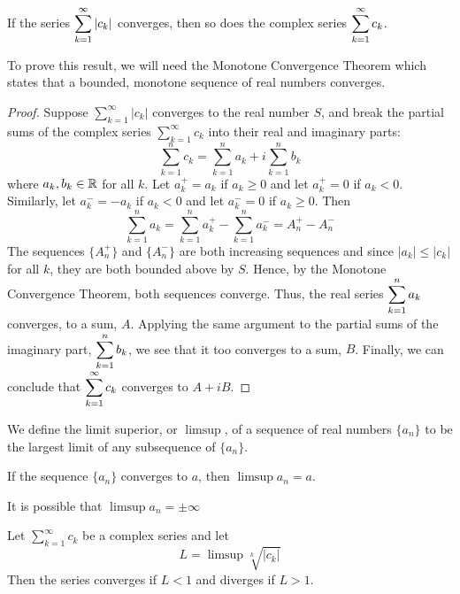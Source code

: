 \documentclass[handout]{ximera}
\begin{document}
\begin{theorem}
If the series $\displaystyle \sum_{k=1}^\infty |c_k|$ converges, then so does the complex series $\displaystyle \sum_{k=1}^\infty c_k$.
\end{theorem}


\begin{remark}
To prove this result, we will need the Monotone Convergence Theorem which states that a bounded, monotone sequence of real numbers converges.
\end{remark}

\begin{proof}
Suppose $\displaystyle \sum_{k=1}^\infty |c_k|$ converges to the real number $S$, and break the partial sums of  the complex series 
$\displaystyle \sum_{k=1}^\infty c_k$ into their real and imaginary parts:
\[
\sum_{k=1}^n c_k =  \sum_{k=1}^n a_k + i\sum_{k=1}^n b_k
\]
where $a_k, b_k \in \mathbb R$ for all $k$.  Let $a_k^+ = a_k$ if $a_k \geq 0$ and let $a_k^+ = 0$ if $a_k < 0$.
Similarly, let $a_k^- = -a_k$ if $a_k < 0$ and let $a_k^- = 0$ if $a_k \geq 0$. Then 
\[
\sum_{k=1}^n a_k = \sum_{k=1}^n a_k^+ - \sum_{k=1}^n a_k^- = A_n^+ - A_n^-
\]
The sequences $\{A_n^+\}$ and $\{A_n^-\}$ are both increasing sequences and since $|a_k| \leq |c_k|$ for all $k$, they are both bounded above by $S$.
Hence, by the Monotone Convergence Theorem, both sequences converge.
Thus, the real series $\displaystyle \sum_{k=1}^n a_k$ converges, to a sum, $A$. Applying the same argument to the partial sums of the imaginary part, 
$\displaystyle \sum_{k=1}^n b_k$, we see that it too converges to a sum, $B$. Finally, we can conclude that $\displaystyle \sum_{k=1}^\infty c_k$ converges to $A + iB$. 
\end{proof}


\begin{definition}
We define the limit superior, or $\limsup$, of a sequence of real numbers $\{a_n\}$ to be the largest limit of any subsequence of $\{a_n\}$.\
\end{definition}


\begin{remark}
If the sequence $\{a_n\}$ converges to $a$, then $\limsup a_n =a$.
\end{remark}

\begin{remark}
It is possible that $\limsup a_n =\pm\infty$
\end{remark}


\begin{theorem}
Let $\displaystyle \sum_{k=1}^\infty c_k$ be a complex series and let 
\[
L = \limsup \sqrt[k]{|c_k|}
\]
Then the series converges if $L <1$ and diverges if $L >1$.
\end{theorem}
\end{document}
